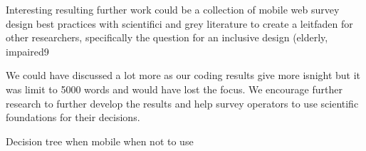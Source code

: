 

Interesting resulting further work could be a collection of mobile web survey design best practices with scientifici and grey literature to create a leitfaden for other researchers, specifically the question for an inclusive design (elderly, impaired9


We could have discussed a lot more as our coding results give more isnight but it was limit to 5000 words and would have lost the focus. We encourage further research to further develop the results and help survey operators to use scientific foundations for their decisions. 



Decision tree when mobile when not to use
